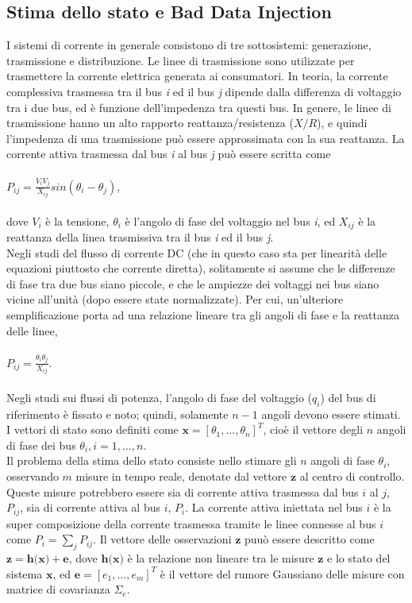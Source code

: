 \subsection{Stima dello stato e Bad Data Injection}
I sistemi di corrente in generale consistono di tre sottosistemi: generazione, trasmissione e distribuzione. Le linee di trasmissione sono utilizzate per trasmettere la corrente elettrica generata ai consumatori. In teoria, la corrente complessiva trasmessa tra il bus \emph{i} ed il bus \emph{j} dipende dalla differenza di voltaggio tra i due bus, ed è funzione dell'impedenza tra questi bus. In genere, le linee di trasmissione hanno un alto rapporto reattanza/resistenza ($X/R$), e quindi l'impedenza di una trasmissione può essere approssimata con la sua reattanza. La corrente attiva trasmessa dal bus \emph{i} al bus \emph{j} può essere scritta come 
\\
\\
\indent$P_{ij} = \frac{V_{i}V_{j}}{X_{ij}}sin(\theta_{i} - \theta_{j})$,
\\
\\
dove $V_{i}$ è la tensione, $\theta_{i}$ è l'angolo di fase del voltaggio nel bus \emph{i}, ed $X_{ij}$ è la reattanza della linea trasmissiva tra il bus \emph{i} ed il bus \emph{j}.\\
Negli studi del flusso di corrente DC (che in questo caso sta per linearità delle equazioni piuttosto che corrente diretta), solitamente si assume che le differenze di fase tra due bus siano piccole, e che le ampiezze dei voltaggi nei bus siano vicine all'unità (dopo essere state normalizzate). Per cui, un'ulteriore semplificazione porta ad una relazione lineare tra gli angoli di fase e la reattanza delle linee,
\\
\\
\indent$P_{ij} = \frac{\theta_{i}\theta_{j}}{X_{ij}}$.
\\
\\
Negli studi sui flussi di potenza, l'angolo di fase del voltaggio ($q_i$) del bus di riferimento è fissato e noto; quindi, solamente $n - 1$ angoli devono essere stimati. I vettori di stato sono definiti come $\textbf{x} = [\theta_1, \ldots, \theta_n]^T$, cioè il vettore degli $n$ angoli di fase dei bus $\theta_i, i = 1, \ldots, n$.\\
Il problema della stima dello stato consiste nello stimare gli $n$ angoli di fase $\theta_i$, osservando $m$ misure in tempo reale, denotate dal vettore $\textbf{z}$ al centro di controllo. Queste misure potrebbero essere sia di corrente attiva trasmessa dal bus $i$ al $j$, $P_{ij}$, sia di corrente attiva al bus $i$, $P_i$. La corrente attiva iniettata nel bus $i$ è la super composizione della corrente trasmessa tramite le linee connesse al bus $i$ come $P_i = \sum_j{P_{ij}}$. Il vettore delle osservazioni $\textbf{z}$ puuò essere descritto come $\textbf{z} = \textbf{h(x)} + \textbf{e}$, dove $\textbf{h(x)}$ è la relazione non lineare tra le misure $\textbf{z}$ e lo stato del sistema $\textbf{x}$, ed $\textbf{e} = [e_1, \ldots, e_m]^T$ è il vettore del rumore Gaussiano delle misure con matrice di covarianza $\Sigma_e$.\\
